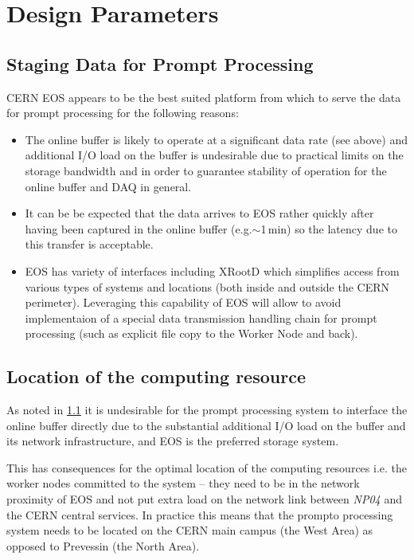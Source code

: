 \documentclass[pdftex,12pt,letter]{article}
\newcommand{\xrd}{XRootD\xspace}
\newcommand{\expname}{\textit{NP04}\xspace}
\begin{document}
\section{Design Parameters}
\label{sec:parameters}

\subsection{Staging Data for Prompt Processing}
\label{sec:staging}
CERN EOS appears to be the best suited platform from which to
serve the data for prompt processing for the following reasons:
\begin{itemize}

\item The online buffer is likely to operate at a significant data rate (see above) and additional I/O load on the
buffer is undesirable due to practical limits on the storage bandwidth and in order to guarantee stability of
operation for the online buffer and DAQ in general.

\item It can be be expected that the data arrives to EOS rather quickly after having been captured in the online buffer
(e.g.$\sim$1\,min) so the latency due to this transfer is acceptable.

\item EOS has variety of interfaces including \xrd \cite{xrootd} which simplifies access from various types of
systems and  locations (both inside and outside the CERN perimeter). Leveraging this capability of EOS will
allow to avoid implementaion of a special data transmission handling chain for prompt processing
(such as explicit file copy to the Worker Node and back).

\end{itemize}

\subsection{Location of the computing resource}
As noted in \ref{sec:staging} it is undesirable for the prompt processing system to interface the online
buffer directly due to the substantial additional I/O load on the buffer and its network infrastructure,
and EOS is the preferred storage system.

This has consequences for the optimal location of the computing resources i.e. the worker nodes
committed to the system -- they need to be in the network proximity of EOS and not put extra
load on the network link between \expname and the CERN central services. In practice this means
that the prompto processing system needs to be located on the CERN main campus (the West Area)
as opposed to Prevessin (the North Area).
\end{document}
